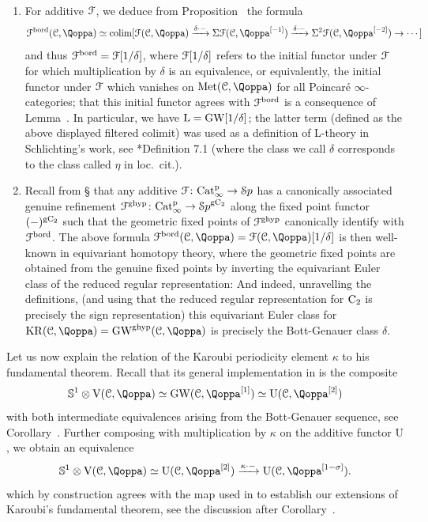 









\begin{remark}\
\begin{enumerate}
\item For additive $\mathcal{F}$, we deduce from Proposition~ the formula 
\[
\F^\bord(\C,\QF) \simeq \colim [\F(\C,\QF) \xrightarrow{\delta\cdot -} \Sigma \F(\C,\QF\qshift{-1}) \xrightarrow{\delta\cdot -} \Sigma^2 \F(\C,\QF\qshift{-2}) \to \cdots ]
\]
and thus $\mathcal{F}^{\mathrm{bord}} = \mathcal{F}[1/\delta]$, where $\mathcal{F}[1/\delta]$ refers to the initial functor under $\mathcal{F}$ for which multiplication by $\delta$ is an equivalence, or equivalently, the initial functor under $\mathcal{F}$ which vanishes on $\Met(\C,\QF)$ for all Poincar\'e $\infty$-categories; that this initial functor agrees with $\mathcal{F}^{\mathrm{bord}}$ is a consequence of Lemma~. In particular, we have $\operatorname L = \operatorname{GW}[1/\delta]$; the latter term (defined as the above displayed filtered colimit) was used as a definition of L-theory in Schlichting's work, see \cite{schlichting-derived}*{Definition 7.1} (where the class we call $\delta$ corresponds to the class called $\eta$ in loc.\ cit.).
\item Recall from \S\reftwo{subsection:Mackey} that any additive $\mathcal{F}\colon \mathrm{Cat}^{\mathrm p}_\infty \to {\mathcal Sp}$ has a canonically associated genuine refinement $\mathcal{F}^{\mathrm{g}\mathrm{hyp}} \colon \mathrm{Cat}^{\mathrm p}_\infty \to {\mathcal Sp}^{\mathrm{g}\mathrm{C_2}}$ along the fixed point functor $(-)^{\mathrm{g}\mathrm{C_2}}$ such that the geometric fixed points of $\mathcal{F}^{\mathrm{g}\mathrm{hyp}}$ canonically identify with $\mathcal{F}^{\mathrm{bord}}$. The above formula $\F^\bord(\C,\QF) = \F(\C,\QF)[1/\delta]$ is then well-known in equivariant homotopy theory, where the geometric fixed points are obtained from the genuine fixed points by inverting the equivariant Euler class of the reduced regular representation: And indeed, unravelling the definitions, (and using that the reduced regular representation for $\mathrm{C_2}$ is precisely the sign representation) this equivariant Euler class for $\KR(\C,\QF)=\GW^{\g\hyp}(\C,\QF)$ is precisely the Bott-Genauer class $\delta$.
\end{enumerate}
\end{remark}






Let us now explain the relation of the Karoubi periodicity element $\kappa$ to his fundamental theorem. Recall that its general implementation in \papertwo is the composite
\[
\mathbb S^1 \otimes \mathrm V(\C,\QF) \simeq \GW(\C,\QF\qshift{1}) \simeq \mathrm U(\C,\QF\qshift{2})
\]
with both intermediate equivalences arising from the Bott-Genauer sequence, see Corollary~. Further composing with multiplication by $\kappa$ on the additive functor $\mathrm{U}$, we obtain an equivalence 
\[
\mathbb S^1 \otimes \mathrm V(\C,\QF) \simeq \mathrm U(\C,\QF\qshift{2}) \xrightarrow{\kappa \cdot -} \mathrm U(\C,\QF\qshift{1-\sigma}).
\]
which by construction agrees with the map used in \papertwo to establish our extensions of Karoubi's fundamental theorem, see the discussion after Corollary~. 



